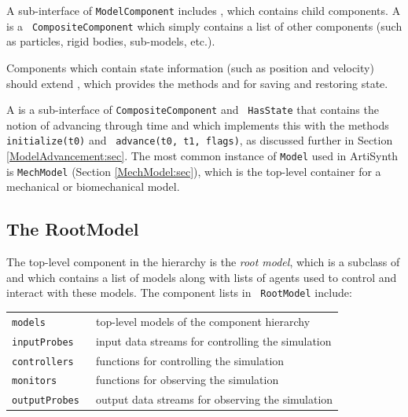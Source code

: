 A sub-interface of {\tt ModelComponent} includes
, which
contains child components.  A
 is a {\tt
CompositeComponent} which simply contains a list of other components
(such as particles, rigid bodies, sub-models, etc.).

Components which contain state information (such as position and
velocity) should extend 
, 
which provides the methods
and
for saving and restoring state.

A
is a sub-interface of {\tt CompositeComponent} and {\tt
HasState} that contains the notion of advancing through time and which
implements this with the methods {\tt initialize(t0)} and {\tt
advance(t0, t1, flags)}, as discussed further in
Section \ref{ModelAdvancement:sec}.
The most common instance of {\tt Model} used
in ArtiSynth is {\tt MechModel} (Section \ref{MechModel:sec}), which
is the top-level container for a mechanical or biomechanical model.

\subsection{The RootModel}
\label{RootModel:sec}

The top-level component in the hierarchy is the {\it root model},
which is a subclass of 
and which contains a list of models along with lists of agents used to
control and interact with these models. The component lists in {\tt
RootModel} include:

\begin{shadedregion}
\begin{tabular}{ll}
\tt models & top-level models of the component hierarchy \\
\tt inputProbes & input data streams for controlling the simulation \\
\tt controllers & functions for controlling the simulation \\
\tt monitors & functions for observing the simulation \\
\tt outputProbes & output data streams for observing the simulation \\
\end{tabular}
\end{shadedregion}

